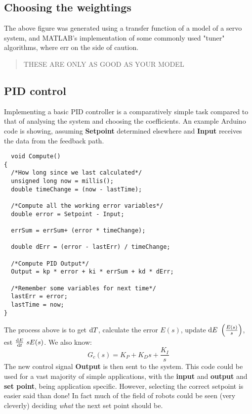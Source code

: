 \subsection{Choosing the weightings}
The above figure was generated using a transfer function of a model of a servo system, and MATLAB's implementation of some commonly used "tuner" algorithms, where err on the side of caution.
\begin{quote}
  THESE ARE ONLY AS GOOD AS YOUR MODEL
\end{quote}
\subsection{PID control}
Implementing a basic PID controller is a comparatively simple task compared to that of analysing the system and choosing the coefficients. An example Arduino code is showing, assuming \textbf{Setpoint} determined elsewhere and \textbf{Input} receives the data from the feedback path.
\begin{verbatim}
  void Compute()
{
  /*How long since we last calculated*/
  unsigned long now = millis();
  double timeChange = (now - lastTime);

  /*Compute all the working error variables*/
  double error = Setpoint - Input;

  errSum = errSum+ (error * timeChange);

  double dErr = (error - lastErr) / timeChange;

  /*Compute PID Output*/
  Output = kp * error + ki * errSum + kd * dErr;

  /*Remember some variables for next time*/
  lastErr = error;
  lastTime = now;
}
\end{verbatim}
The process above is to get $\dif T$, calculate the error $E(s)$, update $\dif E \ \left(\frac{E(s)}{s}\right)$, est $\frac{\dif E}{\dif t} \ sE(s)$. We also know:
\begin{equation}
  G_c (s) = K_P + K_D s + \frac{K_I}{s}
\end{equation}
The new control signal \textbf{Output} is then sent to the system. This code could be used for a vast majority of simple applications, with the \textbf{input} and \textbf{output} and \textbf{set point}, being application specific. However, selecting the correct setpoint is easier said than done! In fact much of the field of robots could be seen (very cleverly) deciding \textit{what} the next set point should be.